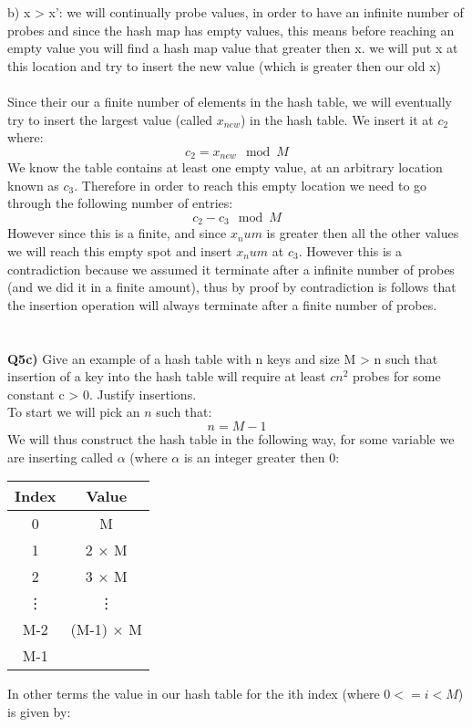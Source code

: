 \documentclass[12pt]{article}
\begin{document}
\begin{adjustwidth}{0em}{0pt}
b) x > x': we will continually probe values, in order to have an infinite number of probes and since the hash map has empty values, this means before reaching an empty value you will find a hash map value that greater then x. we will put x at this location and try to insert the new value (which is greater then our old x)\\\\
Since their our a finite number of elements in the hash table, we will eventually try to insert the largest value (called $x_{new}$) in the hash table. We insert it at $c_2$ where:
\[ c_2 = x_{new} \mod M \]
We know the table contains at least one empty value, at an arbitrary location known as $c_3$. Therefore in order to reach this empty location we need to go through the following number of entries:
\[ c_2 - c_3 \mod M \]
However since this is a finite, and since $x_num$ is greater then all the other values we will reach this empty spot and insert $x_num$ at $c_3$. However this is a contradiction because we assumed it terminate after a infinite number of probes (and we did it in a finite amount), thus by proof by contradiction is follows that the insertion operation will always terminate after a finite number of probes.\\\\\\
\textbf{Q5c)} Give an example of a hash table with n keys and size
M > n such that insertion of a key into the hash table will require at least $cn^2$ probes for some constant c > 0. Justify insertions. \\
To start we will pick an $n$ such that:
\[ n = M - 1 \]
We will thus construct the hash table in the following way, for some variable we are inserting called $\alpha$ (where $\alpha$ is an integer greater then 0:
\begin{center}
\begin{tabular}{||c | c||}
	\hline
    Index & Value\\
    \hline\hline
    0 & M\\
    \hline
    1 & 2 $\times$ M\\
    \hline
    2 & 3 $\times$ M\\
    \hline
    \vdots & \vdots\\
    \hline
    M-2 & (M-1) $\times$ M\\
    \hline
    M-1 & \\
    \hline
\end{tabular}
\end{center}
In other terms the value in our hash table for the ith index (where $0 <= i < M$) is given by:

\end{adjustwidth}
\end{document}

